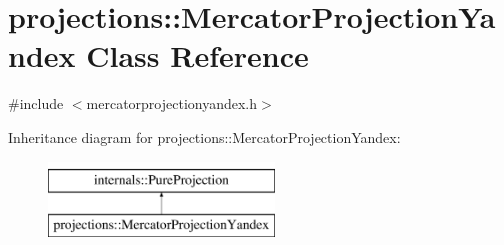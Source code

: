 \hypertarget{classprojections_1_1_mercator_projection_yandex}{\section{projections\-:\-:Mercator\-Projection\-Yandex Class Reference}
\label{classprojections_1_1_mercator_projection_yandex}
}


{\ttfamily \#include $<$mercatorprojectionyandex.\-h$>$}

Inheritance diagram for projections\-:\-:Mercator\-Projection\-Yandex\-:\begin{figure}[H]
\begin{center}
\leavevmode
\includegraphics[height=2.000000cm]{classprojections_1_1_mercator_projection_yandex}
\end{center}
\end{figure}
